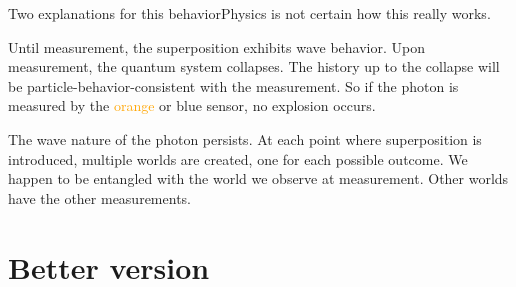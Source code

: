 \begin{frame}{Two explanations for this behavior}{Physics is not certain how this really works.}
  \begin{description}
     \item<1->[\href{https://en.wikipedia.org/wiki/Copenhagen_interpretation}{Copenhagen}] Until measurement, the superposition exhibits wave behavior.  Upon measurement, the quantum system collapses.  The history up to the collapse will be particle-behavior-consistent with the measurement.  So if the photon is measured by the \textcolor{orange}{orange} or
     \textcolor{NavyBlue}{blue} sensor, no explosion occurs.
     \item<2>[\href{https://en.wikipedia.org/wiki/Many-worlds_interpretation}{Many worlds}] The wave nature of the photon persists.  At each point where superposition is introduced, multiple worlds are created, one for each possible outcome.  We happen to be entangled with the world we observe at measurement.  Other worlds have the other measurements.
  \end{description}
  
\end{frame}

\section{Better version}

